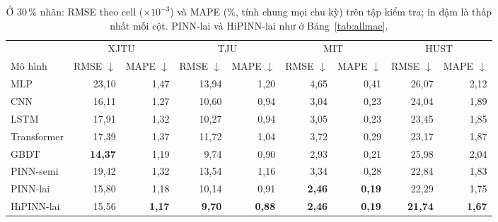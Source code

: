 \begin{table}[!htbp]\centering\footnotesize
\caption[RMSE và MAPE của mọi mô hình chính ở 30\,\% nhãn]{Ở 30\,\% nhãn: RMSE theo cell ($\times10^{-3}$) và MAPE (\%, tính chung mọi chu kỳ) trên tập kiểm tra; in đậm là thấp nhất mỗi cột. PINN-lai và HiPINN-lai như ở Bảng~\ref{tab:allmae}.}\label{tab:allrm}
\begin{adjustbox}{max width=\textwidth}\begin{tabular}{lrrrrrrrr}\toprule
 & \multicolumn{2}{c}{XJTU} & \multicolumn{2}{c}{TJU} & \multicolumn{2}{c}{MIT} & \multicolumn{2}{c}{HUST} \\\cmidrule(lr){2-3}\cmidrule(lr){4-5}\cmidrule(lr){6-7}\cmidrule(lr){8-9}
Mô hình & RMSE $\downarrow$ & MAPE $\downarrow$ & RMSE $\downarrow$ & MAPE $\downarrow$ & RMSE $\downarrow$ & MAPE $\downarrow$ & RMSE $\downarrow$ & MAPE $\downarrow$ \\\midrule
MLP & 23{,}10 & 1{,}47 & 13{,}94 & 1{,}20 & 4{,}65 & 0{,}41 & 26{,}07 & 2{,}12 \\
CNN & 16{,}11 & 1{,}27 & 10{,}60 & 0{,}94 & 3{,}04 & 0{,}23 & 24{,}04 & 1{,}89 \\
LSTM & 17{,}91 & 1{,}32 & 10{,}27 & 0{,}94 & 3{,}05 & 0{,}23 & 23{,}45 & 1{,}85 \\
Transformer & 17{,}39 & 1{,}37 & 11{,}72 & 1{,}04 & 3{,}72 & 0{,}29 & 23{,}17 & 1{,}87 \\
GBDT & \textbf{14{,}37} & 1{,}19 & 9{,}74 & 0{,}90 & 2{,}93 & 0{,}21 & 25{,}98 & 2{,}04 \\
PINN-semi & 19{,}42 & 1{,}32 & 13{,}54 & 1{,}16 & 3{,}34 & 0{,}28 & 22{,}84 & 1{,}83 \\
PINN-lai & 15{,}80 & 1{,}18 & 10{,}14 & 0{,}91 & \textbf{2{,}46} & \textbf{0{,}19} & 22{,}29 & 1{,}75 \\
HiPINN-lai & 15{,}56 & \textbf{1{,}17} & \textbf{9{,}70} & \textbf{0{,}88} & \textbf{2{,}46} & \textbf{0{,}19} & \textbf{21{,}74} & \textbf{1{,}67} \\
\bottomrule\end{tabular}\end{adjustbox}\end{table}
